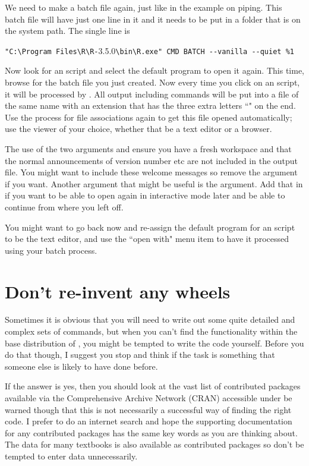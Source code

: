 We need to make a batch file again, just like in the example on piping. This batch file will have just one line in it and it needs to be put in a folder that is on the system path. The single line is 
\begin{center} 
\verb+"C:\Program Files\R\R-+3.5.0\verb+\bin\R.exe" CMD BATCH --vanilla --quiet %1+ 
\end{center} 
 
Now look for an \R{} script and select the default program to open it again. This time, browse for the batch file you just created. Now every time you click on an \R{} script, it will be processed by \R{}. All output including commands will be put into a file of the same name with an extension that has the three extra letters ``" on the end. Use the process for file associations again to get this file opened automatically; use the viewer of your choice, whether  that be a text editor or a browser. 
 
The use of the two arguments  and  ensure you have a fresh workspace and that the normal announcements of version number etc are not included in the output file. You might want to include these welcome messages so remove the  argument if you want. Another argument that might be useful is the  argument. Add that in if you want to be able to open \R{} again in interactive mode later and be able to continue from where you left off. 
 
You might want to go back now and re-assign the default program for an \R{} script to be the text editor, and use the ``open with" menu item to have it processed using your batch process. 
 
 
 
 
 
 
\section{Don't re-invent any wheels} 
 
Sometimes it is obvious that you will need to write out some quite detailed and complex sets of commands, but when you can't find the functionality within the base distribution of \R{}, you might be tempted to write the code yourself. Before you do that though, I suggest you stop and think if the task is something that someone else is likely to have done before. 
 
If the answer is yes, then you should look at the vast list of contributed packages available via the Comprehensive \R{} Archive 
Network (CRAN) accessible under  
be warned though that this is not necessarily a successful way of finding the right code. I prefer to do an internet search and hope the supporting documentation for any contributed packages has the same key words as you are thinking about. The data for many textbooks is also available as contributed packages so don't be tempted to enter data unnecessarily. 
 



